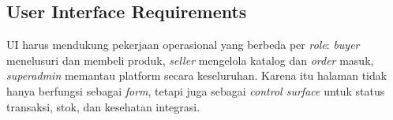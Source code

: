 
\subsection{User Interface Requirements}

UI harus mendukung pekerjaan operasional yang berbeda per \textit{role}:
\textit{buyer} menelusuri dan membeli produk, \textit{seller} mengelola katalog
dan \textit{order} masuk, \textit{superadmin} memantau platform secara
keseluruhan. Karena itu halaman tidak hanya berfungsi sebagai \textit{form},
tetapi juga sebagai \textit{control surface} untuk status transaksi, stok, dan
kesehatan integrasi.

